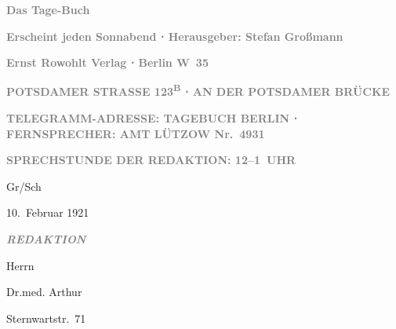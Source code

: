 \pstart
           \centering{}{\pb}\textcolor{gray}{\textbf{Das Tage-Buch}}\pend
           
\pstart
           \centering{}\textcolor{gray}{\textbf{Erscheint jeden Sonnabend ⋅ Herausgeber: Stefan Großmann}}\pend
           
\pstart
           \centering{}\textcolor{gray}{\textbf{Ernst Rowohlt Verlag ⋅ Berlin W 35}}\pend
           
\pstart
           \centering{}\textcolor{gray}{\textbf{POTSDAMER STRASSE 123\textsuperscript{B} ⋅ AN DER POTSDAMER BRÜCKE}}\pend
           
\pstart
           \centering{}\textcolor{gray}{\textbf{TELEGRAMM-ADRESSE: TAGEBUCH
                        BERLIN ⋅ FERNSPRECHER: AMT LÜTZOW
                     Nr. 4931}}\pend
           
\pstart
           \centering{}\textcolor{gray}{\textbf{SPRECHSTUNDE DER REDAKTION: 12–1 UHR}}\pend
           
\pstart
           Gr/Sch\pend
           
\pstart
           \centering{}10. Februar 1921\pend
           
\pstart
           \textcolor{gray}{\textbf{\emph{REDAKTION}}}\pend
           
\pstart
           Herrn\pend
           
\pstart
           Dr.med. Arthur \pend
           
\pstart
           \pend
           
\pstart
           Sternwartstr. 71\pend
           
